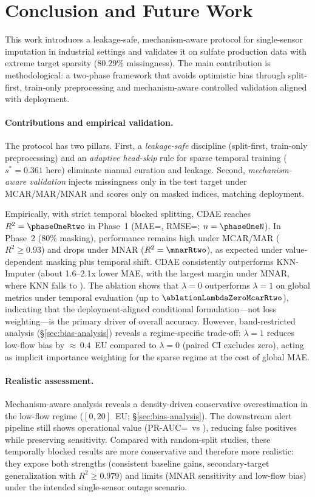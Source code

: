 \section{Conclusion and Future Work}\label{sec:conclusion}

This work introduces a leakage-safe, mechanism-aware protocol for single-sensor imputation in industrial settings and validates it on sulfate production data with extreme target sparsity (80.29\% missingness). The main contribution is methodological: a two-phase framework that avoids optimistic bias through split-first, train-only preprocessing and mechanism-aware controlled validation aligned with deployment.

\paragraph{Contributions and empirical validation.}
The protocol has two pillars. First, a \emph{leakage-safe} discipline (split-first, train-only preprocessing) and an \emph{adaptive head-skip} rule for sparse temporal training ($s^*=0.361$ here) eliminate manual curation and leakage. Second, \emph{mechanism-aware validation} injects missingness only in the test target under MCAR/MAR/MNAR and scores only on masked indices, matching deployment.

Empirically, with strict temporal blocked splitting, CDAE reaches $R^2=\phaseOneRtwo$ in Phase~1 (MAE=\phaseOneMAE, RMSE=\phaseOneRMSE; $n=\phaseOneN$). In Phase~2 (80\% masking), performance remains high under MCAR/MAR ($R^2 \ge 0.93$) and drops under MNAR ($R^2=\mnarRtwo$), as expected under value-dependent masking plus temporal shift. CDAE consistently outperforms KNN-Imputer (about 1.6--2.1x lower MAE, with the largest margin under MNAR, where KNN falls to \knnMnarRtwo). The ablation shows that $\lambda=0$ outperforms $\lambda=1$ on global metrics under temporal evaluation (up to $\ablationLambdaZeroMcarRtwo$), indicating that the deployment-aligned conditional formulation---not loss weighting---is the primary driver of overall accuracy. However, band-restricted analysis (\S\ref{sec:bias-analysis}) reveals a regime-specific trade-off: $\lambda{=}1$ reduces low-flow bias by ${\approx}\,0.4$~EU compared to $\lambda{=}0$ (paired CI excludes zero), acting as implicit importance weighting for the sparse regime at the cost of global MAE.

\paragraph{Realistic assessment.}
Mechanism-aware analysis reveals a density-driven conservative overestimation in the low-flow regime ($[0,20]$~EU; \S\ref{sec:bias-analysis}). The downstream alert pipeline still shows operational value (PR-AUC=\downstreamPRAUC\ vs \downstreamPRAUCBaseline), reducing false positives while preserving sensitivity. Compared with random-split studies, these temporally blocked results are more conservative and therefore more realistic: they expose both strengths (consistent baseline gains, secondary-target generalization with $R^2 \ge 0.979$) and limits (MNAR sensitivity and low-flow bias) under the intended single-sensor outage scenario.

